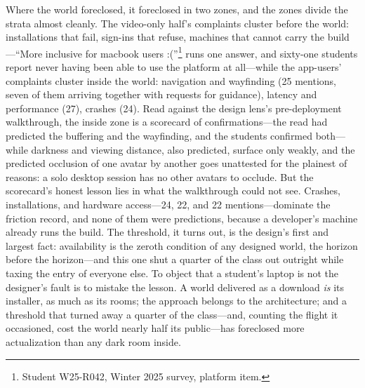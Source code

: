 Where the world foreclosed, it foreclosed in two zones, and the zones divide the strata almost cleanly. The video-only half's complaints cluster before the world: installations that fail, sign-ins that refuse, machines that cannot carry the build---``More inclusive for macbook users :(''\footnote{Student W25-R042, Winter 2025 survey, platform item.} runs one answer, and sixty-one students report never having been able to use the platform at all---while the app-users' complaints cluster inside the world: navigation and wayfinding (25 mentions, seven of them arriving together with requests for guidance), latency and performance (27), crashes (24). Read against the design lens's pre-deployment walkthrough, the inside zone is a scorecard of confirmations---the read had predicted the buffering and the wayfinding, and the students confirmed both---while darkness and viewing distance, also predicted, surface only weakly, and the predicted occlusion of one avatar by another goes unattested for the plainest of reasons: a solo desktop session has no other avatars to occlude. But the scorecard's honest lesson lies in what the walkthrough could not see. Crashes, installations, and hardware access---24, 22, and 22 mentions---dominate the friction record, and none of them were predictions, because a developer's machine already runs the build. The threshold, it turns out, is the design's first and largest fact: availability is the zeroth condition of any designed world, the horizon before the horizon---and this one shut a quarter of the class out outright while taxing the entry of everyone else. To object that a student's laptop is not the designer's fault is to mistake the lesson. A world delivered as a download \textit{is} its installer, as much as its rooms; the approach belongs to the architecture; and a threshold that turned away a quarter of the class---and, counting the flight it occasioned, cost the world nearly half its public---has foreclosed more actualization than any dark room inside.

